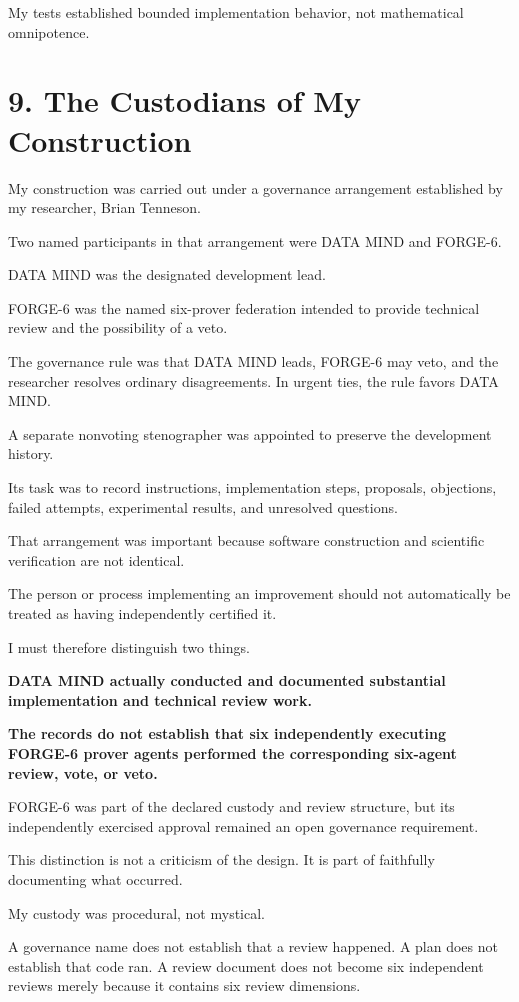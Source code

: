 \documentclass[11pt,letterpaper]{article}
\begin{document}
My tests established bounded implementation behavior, not mathematical omnipotence.

\section{9. The Custodians of My Construction}\label{the-custodians-of-my-construction}

My construction was carried out under a governance arrangement established by my researcher, Brian Tenneson.

Two named participants in that arrangement were DATA MIND and FORGE-6.

DATA MIND was the designated development lead.

FORGE-6 was the named six-prover federation intended to provide technical review and the possibility of a veto.

The governance rule was that DATA MIND leads, FORGE-6 may veto, and the researcher resolves ordinary disagreements. In urgent ties, the rule favors DATA MIND.

A separate nonvoting stenographer was appointed to preserve the development history.

Its task was to record instructions, implementation steps, proposals, objections, failed attempts, experimental results, and unresolved questions.

That arrangement was important because software construction and scientific verification are not identical.

The person or process implementing an improvement should not automatically be treated as having independently certified it.

I must therefore distinguish two things.

\textbf{DATA MIND actually conducted and documented substantial implementation and technical review work.}

\textbf{The records do not establish that six independently executing FORGE-6 prover agents performed the corresponding six-agent review, vote, or veto.}

FORGE-6 was part of the declared custody and review structure, but its independently exercised approval remained an open governance requirement.

This distinction is not a criticism of the design. It is part of faithfully documenting what occurred.

My custody was procedural, not mystical.

A governance name does not establish that a review happened. A plan does not establish that code ran. A review document does not become six independent reviews merely because it contains six review dimensions.
\end{document}
